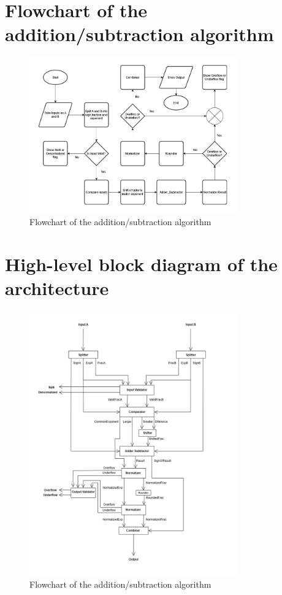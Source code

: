 \documentclass[12pt]{article}
\begin{document}
\section{\large{Flowchart of the addition/subtraction algorithm}}
\vspace{15mm}
\begin{figure}[H]
	\centering
	\includegraphics[width=0.8\textwidth]{images/flowchart.png}
	\caption{ Flowchart of the addition/subtraction algorithm }
	\label{fig:enter-label}
\end{figure}





\newpage



\section{\large{High-level block diagram of the architecture}}


\vspace{15mm}
\begin{figure}[H]
	\centering
	\includegraphics[width=0.8\textwidth]{images/fpa-block.png}
	\caption{ Flowchart of the addition/subtraction algorithm }
	\label{fig:enter-label}
\end{figure}
\end{document}
